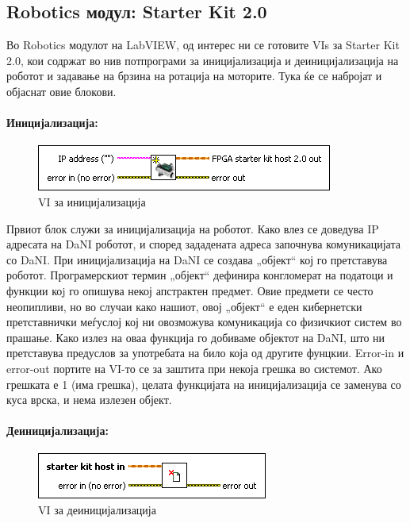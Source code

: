 \documentclass[12pt]{article}
\begin{document}
  \subsection{Robotics модул: Starter Kit 2.0}
    Во Robotics модулот на LabVIEW, од интерес ни се готовите VIs за Starter Kit 2.0, кои содржат во нив потпрограми за иницијализација и деиницијализација на роботот и задавање на брзина на ротација на моторите. Тука ќе се набројат и објаснат овие блокови.

		\paragraph{Иницијализација:\\}

			\begin{figure}[h]
				\includegraphics[width=0.55\linewidth]{./images/init.png}
				\raggedright
				\caption{VI за иницијализација}
				\label{fig:init.png}
				\end{figure}

		  Првиот блок служи за иницијализација на роботот. Како влез се доведува IP адресата на DaNI роботот, и според зададената адреса започнува комуникацијата со DaNI. При иницијализација на DaNI се создава „објект“ кој го претставува роботот. Програмерскиот термин „објект“ дефинира конгломерат на податоци и функции коj го опишува некој апстрактен предмет. Овие предмети се често неопипливи, но во случаи како нашиот, овој „објект“ е еден кибернетски претставнички меѓуслој кој ни овозможува комуникација со физичкиот систем во прашање. Како излез на оваа функција го добиваме објектот на DaNI, што ни претставува предуслов за употребата на било која од другите фунцкии. Error-in и error-out портите на VI-то се за заштита при некоја грешка во системот. Ако грешката е 1 (има грешка), целата функцијата на иницијализација се заменува со куса врска, и нема излезен објект. \\

    \paragraph{Деиницијализација:\\}
			\begin{figure}[h]
				\includegraphics[width = 0.55\linewidth]{./images/deinit.png}
				\raggedright
				\caption{VI за деиницијализација}
				\label{fig:deinit.png}
				\end{figure}
\end{document}
